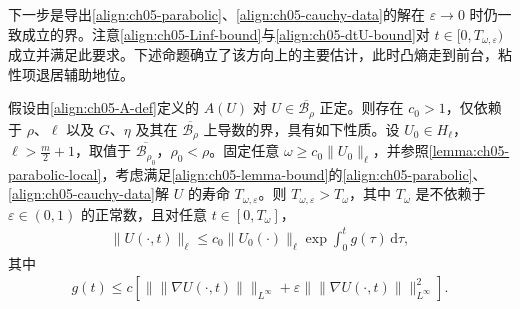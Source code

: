 \documentclass[../../main.tex]{subfiles}
\begin{document}
下一步是导出\eqref{align:ch05-parabolic}、\eqref{align:ch05-cauchy-data}的解在 $\varepsilon\to0$ 时仍一致成立的界。注意\eqref{align:ch05-Linf-bound}与\eqref{align:ch05-dtU-bound}对 $t\in[0,T_{\omega,\varepsilon})$ 成立并满足此要求。下述命题确立了该方向上的主要估计，此时凸熵走到前台，粘性项退居辅助地位。

\begin{lemma}\label{lemma:ch05-uniform-bound}
假设由\eqref{align:ch05-A-def}定义的 $A(U)$ 对 $U\in\overline{\mathscr{B}_{\rho}}$ 正定。则存在 $c_{0}>1$，仅依赖于 $\rho$、$\ell$ 以及 $G$、$\eta$ 及其在 $\overline{\mathscr{B}_{\rho}}$ 上导数的界，具有如下性质。设 $U_{0}\in H_{\ell}$，$\ell>\frac{m}{2}+1$，取值于 $\overline{\mathscr{B}_{\rho_{0}}}$，$\rho_{0}<\rho$。固定任意 $\omega\geqslant c_{0}\|U_{0}\|_{\ell}$，并参照\cref{lemma:ch05-parabolic-local}，考虑满足\eqref{align:ch05-lemma-bound}的\eqref{align:ch05-parabolic}、\eqref{align:ch05-cauchy-data}解 $U$ 的寿命 $T_{\omega,\varepsilon}$。则 $T_{\omega,\varepsilon}>T_{\omega}$，其中 $T_{\omega}$ 是不依赖于 $\varepsilon\in(0,1)$ 的正常数，且对任意 $t\in[0,T_{\omega}]$，
\begin{align}
\|U(\cdot,t)\|_{\ell}\leqslant c_{0}\|U_{0}(\cdot)\|_{\ell}\exp\int_{0}^{t}g(\tau)\,\mathrm{d}\tau,\label{align:ch05-uniform-est}
\end{align}
其中
\begin{align}
g(t)\leqslant c\left[\|\|\nabla U(\cdot,t)\|\|_{L^{\infty}}+\varepsilon\|\|\nabla U(\cdot,t)\|\|_{L^{\infty}}^{2}\right].\label{align:ch05-g-def}
\end{align}
\end{lemma}
\end{document}
